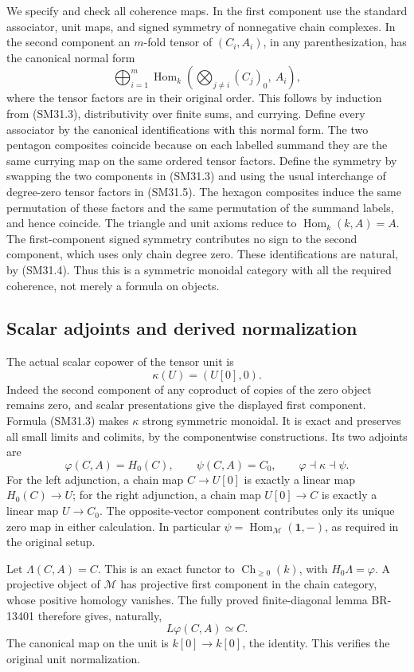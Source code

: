 \documentclass[11pt,a4paper]{article}
\theoremstyle{definition}\newtheorem{definition}[theorem]{Definition}
\theoremstyle{remark}\newtheorem{remark}[theorem]{Remark}
\begin{document}
We specify and check all coherence maps.  In the first component
use the standard associator, unit maps, and signed symmetry of
nonnegative chain complexes.  In the second component an
\(m\)-fold tensor of \((C_i,A_i)\), in any parenthesization,
has the canonical normal form
\[
 \bigoplus_{i=1}^m
  \operatorname{Hom}_k\left(
      \bigotimes_{j\ne i}(C_j)_0,\ A_i\right),             \tag{SM31.5}
\]
where the tensor factors are in their original order.
This follows by induction from (SM31.3), distributivity over
finite sums, and currying.  Define every associator by the
canonical identifications with this normal form.  The two
pentagon composites coincide because on each labelled summand
they are the same currying map on the same ordered tensor
factors.  Define the symmetry by swapping the two components
in (SM31.3) and using the usual interchange of degree-zero
tensor factors in (SM31.5).  The hexagon composites induce the
same permutation of these factors and the same permutation
of the summand labels, and hence coincide.  The triangle and
unit axioms reduce to \(\operatorname{Hom}_k(k,A)=A\).
The first-component signed symmetry contributes no sign to
the second component, which uses only chain degree zero.
These identifications are natural, by (SM31.4).
Thus this is a symmetric monoidal category with all the
required coherence, not merely a formula on objects.

\subsection{Scalar adjoints and derived normalization}
The actual scalar copower of the tensor unit is
\[
 \kappa(U)=(U[0],0).
\]
Indeed the second component of any coproduct of copies of the
zero object remains zero, and scalar presentations give the
displayed first component.  Formula (SM31.3) makes \(\kappa\)
strong symmetric monoidal.  It is exact and preserves all
small limits and colimits, by the componentwise constructions.
Its two adjoints are
\[
 \varphi(C,A)=H_0(C),\qquad
 \psi(C,A)=C_0,
 \qquad \varphi\dashv\kappa\dashv\psi.                    \tag{SM31.6}
\]
For the left adjunction, a chain map \(C\to U[0]\) is exactly
a linear map \(H_0(C)\to U\); for the right adjunction, a
chain map \(U[0]\to C\) is exactly a linear map \(U\to C_0\).
The opposite-vector component contributes only its unique
zero map in either calculation.  In particular
\(\psi=\operatorname{Hom}_{\mathcal M}(\mathbf1,-)\),
as required in the original setup.

Let \(\Lambda(C,A)=C\).  This is an exact functor to
\(\operatorname{Ch}_{\ge0}(k)\), with \(H_0\Lambda=\varphi\).
A projective object of \(\mathcal M\) has projective first
component in the chain category, whose positive homology
vanishes.  The fully proved finite-diagonal lemma BR-13401
therefore gives, naturally,
\[
                     L\varphi(C,A)\simeq C.                \tag{SM31.7}
\]
The canonical map on the unit is \(k[0]\to k[0]\), the
identity.  This verifies the original unit normalization.
\end{document}
